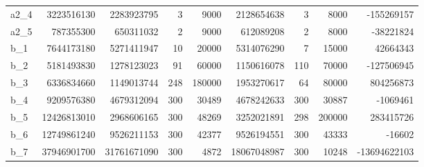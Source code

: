 \documentclass[../informe2.tex]{subfiles}
\begin{document}
\begin{table}[ht!]
{\begin{tabular}{@{}lrrrrrrrr@{}}
a2\_4     & 3223516130                  & 2283923795             & 3                          & 9000                            & 2128654638                & 3                          & 8000                            & -155269157                     \\
a2\_5     & 787355300                   & 650311032              & 2                          & 9000                            & 612089208                 & 2                          & 8000                            & -38221824                      \\
b\_1      & 7644173180                  & 5271411947             & 10                         & 20000                           & 5314076290                & 7                          & 15000                           & 42664343                       \\
b\_2      & 5181493830                  & 1278123023             & 91                         & 60000                           & 1150616078                & 110                        & 70000                           & -127506945                     \\
b\_3      & 6336834660                  & 1149013744             & 248                        & 180000                          & 1953270617                & 64                         & 80000                           & 804256873                      \\
b\_4      & 9209576380                  & 4679312094             & 300                        & 30489                           & 4678242633                & 300                        & 30887                           & -1069461                       \\
b\_5      & 12426813010                 & 2968606165             & 300                        & 48269                           & 3252021891                & 298                        & 200000                          & 283415726                      \\
b\_6      & 12749861240                 & 9526211153             & 300                        & 42377                           & 9526194551                & 300                        & 43333                           & -16602                         \\
b\_7      & 37946901700                 & 31761671090            & 300                        & 4872                            & 18067048987               & 300                        & 10248                           & -13694622103                   \\

\end{tabular}}
\end{table}
\end{document}
